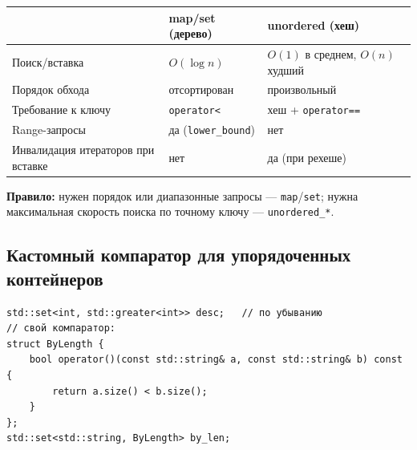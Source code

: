 \begin{center}
\begin{tabular}{lp{4.3cm}p{4.3cm}}
\toprule
& \textbf{map/set (дерево)} & \textbf{unordered (хеш)} \\
\midrule
Поиск/вставка & $O(\log n)$ & $O(1)$ в среднем, $O(n)$ худший \\
\addlinespace
Порядок обхода & отсортирован & произвольный \\
\addlinespace
Требование к ключу & \texttt{operator<} & хеш + \texttt{operator==} \\
\addlinespace
Range-запросы & да (\texttt{lower\_bound}) & нет \\
\addlinespace
Инвалидация итераторов при вставке & нет & да (при рехеше) \\
\bottomrule
\end{tabular}
\end{center}

\textbf{Правило:} нужен порядок или диапазонные запросы --- \texttt{map}/\texttt{set};
нужна максимальная скорость поиска по точному ключу --- \texttt{unordered\_*}.

\subsection{Кастомный компаратор для упорядоченных контейнеров}

\begin{lstlisting}
std::set<int, std::greater<int>> desc;   // по убыванию
// свой компаратор:
struct ByLength {
    bool operator()(const std::string& a, const std::string& b) const {
        return a.size() < b.size();
    }
};
std::set<std::string, ByLength> by_len;
\end{lstlisting}
